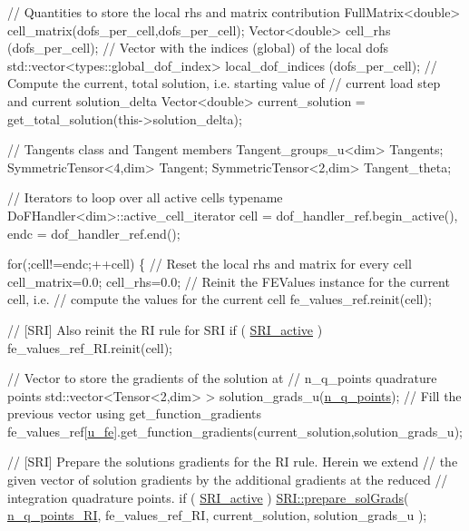 \begin{DoxyCode}
    \textcolor{comment}{// Quantities to store the local rhs and matrix contribution}
     FullMatrix<double> cell\_matrix(dofs\_per\_cell,dofs\_per\_cell);
     Vector<double> cell\_rhs (dofs\_per\_cell);
    \textcolor{comment}{// Vector with the indices (global) of the local dofs}
     std::vector<types::global\_dof\_index> local\_dof\_indices (dofs\_per\_cell);
    \textcolor{comment}{// Compute the current, total solution, i.e. starting value of}
    \textcolor{comment}{// current load step and current solution\_delta}
     Vector<double> current\_solution = get\_total\_solution(this->solution\_delta);

    \textcolor{comment}{// Tangents class and Tangent members}
     Tangent\_groups\_u<dim> Tangents;
     SymmetricTensor<4,dim> Tangent;
     SymmetricTensor<2,dim> Tangent\_theta;

    \textcolor{comment}{// Iterators to loop over all active cells}
     \textcolor{keyword}{typename} DoFHandler<dim>::active\_cell\_iterator cell = dof\_handler\_ref.begin\_active(),
                                                    endc = dof\_handler\_ref.end();

    \textcolor{keywordflow}{for}(;cell!=endc;++cell)
    \{
        \textcolor{comment}{// Reset the local rhs and matrix for every cell}
         cell\_matrix=0.0;
         cell\_rhs=0.0;
        \textcolor{comment}{// Reinit the FEValues instance for the current cell, i.e.}
        \textcolor{comment}{// compute the values for the current cell}
         fe\_values\_ref.reinit(cell);

        \textcolor{comment}{// [SRI] Also reinit the RI rule for SRI}
         \textcolor{keywordflow}{if} ( \hyperlink{assembly__routine__SRI_8cc_a535468030220abae9305a26e9d7f7401}{SRI\_active} )
            fe\_values\_ref\_RI.reinit(cell);

        \textcolor{comment}{// Vector to store the gradients of the solution at}
        \textcolor{comment}{// n\_q\_points quadrature points}
         std::vector<Tensor<2,dim> > solution\_grads\_u(\hyperlink{assembly__routine__SRI_8cc_afd52b693751274175b93a58458201e6b}{n\_q\_points});
        \textcolor{comment}{// Fill the previous vector using get\_function\_gradients}
         fe\_values\_ref[\hyperlink{assembly__routine__SRI_8cc_ae50a49c136e49c33fcd5a555a00009dd}{u\_fe}].get\_function\_gradients(current\_solution,solution\_grads\_u);

        \textcolor{comment}{// [SRI] Prepare the solutions gradients for the RI rule. Herein we extend}
        \textcolor{comment}{// the given vector of solution gradients by the additional gradients at the reduced}
        \textcolor{comment}{// integration quadrature points.}
         \textcolor{keywordflow}{if} ( \hyperlink{assembly__routine__SRI_8cc_a535468030220abae9305a26e9d7f7401}{SRI\_active} )
             \hyperlink{namespaceSRI_add98d0fc70a6c51803dfd8c491547413}{SRI::prepare\_solGrads}( \hyperlink{assembly__routine__SRI_8cc_a0b72b2a33d52b7597b87df35b5b92415}{n\_q\_points\_RI}, fe\_values\_ref\_RI, 
      current\_solution, solution\_grads\_u );


\end{DoxyCode}
